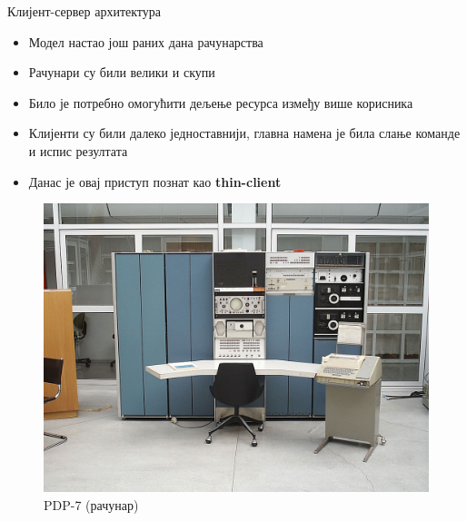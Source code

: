 \documentclass[aspectratio=169]{beamer}
\begin{document}
    \begin{frame}[allowframebreaks]{Клијент-сервер архитектура}
        \begin{itemize}
            \item Модел настао још раних дана рачунарства
            \item Рачунари су били велики и скупи
            \item Било је потребно омогућити дељење ресурса између више корисника
            \item Клијенти су били далеко једноставнији, главна намена је била слање команде и испис резултата
            \item Данас је овај приступ познат као \textbf{thin-client}
        \end{itemize}
        
        \framebreak
        
        \begin{figure}
            \centering
            \includegraphics[width=\textwidth,height=0.55\textheight,keepaspectratio]{images/pdp7.jpeg}
            \caption{PDP-7 (рачунар)}
            \label{fig:mainframe}
        \end{figure}
        
        \framebreak
        

\end{frame}
\end{document}
